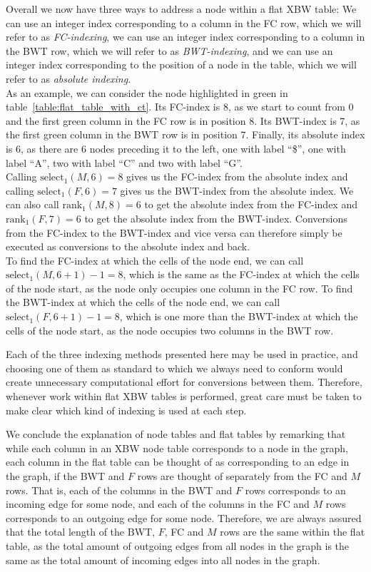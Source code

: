 \documentclass[a4paper,12pt,twoside,BCOR=10mm]{scrbook}
\begin{document}
Overall we now have three ways to address a node within a flat XBW table:
We can use an integer index corresponding to a column in the FC row,
which we will refer to as \textit{FC-indexing}\label{def:fc_indexing},
we can use an integer index corresponding to a column in the BWT row,
which we will refer to as \textit{BWT-indexing}\label{def:bwt_indexing},
and we can use an integer index corresponding to the position of a node in the table,
which we will refer to as \textit{absolute indexing}\label{def:absolute_indexing}. \\
As an example, we can consider the node highlighted in green in table~\ref{table:flat_table_with_ct}.
Its FC-index is 8, as we start to count from 0 and the first green column in the FC row is in position 8.
Its BWT-index is 7, as the first green column in the BWT row is in position 7.
Finally, its absolute index is 6, as there are 6 nodes preceding it to the left, one
with label “\$”, one with label “A”, two with label “C” and two with label “G”. \\
Calling $ \textrm{select}_1 ( M, 6 ) = 8 $ gives us the FC-index from the absolute index and
calling $ \textrm{select}_1 ( F, 6 ) = 7 $ gives us the BWT-index from the absolute index.
We can also call $ \textrm{rank}_1 ( M, 8 ) = 6 $ to get the absolute index from the FC-index
and $ \textrm{rank}_1 ( F, 7 ) = 6 $ to get the absolute index from the BWT-index.
Conversions from the FC-index to the BWT-index and vice versa can therefore simply be executed as conversions
to the absolute index and back. \\
To find the FC-index at which the cells of the node end,
we can call $ \textrm{select}_1 ( M, 6 + 1 ) - 1 = 8 $, which
is the same as the FC-index at which the cells of the node start, as the node
only occupies one column in the FC row.
To find the BWT-index at which the cells of the node end,
we can call $ \textrm{select}_1 ( F, 6 + 1 ) - 1 = 8 $, which
is one more than the BWT-index at which the cells of the node start,
as the node occupies two columns in the BWT row.

Each of the three indexing methods presented here
may be used in practice, and choosing one of them as standard to which
we always need to conform would create unnecessary computational effort for conversions
between them.
Therefore, whenever work within flat XBW tables is performed, great care must be taken
to make clear which kind of indexing is used at each step.

We conclude the explanation of node tables and flat tables by remarking that while each column
in an XBW node table corresponds to a node in the graph,
each column in the flat table can be thought of as corresponding to an edge in the graph,
if the BWT and $ F $ rows are thought of separately from the FC and $ M $ rows.
That is, each of the columns in the BWT and $ F $ rows corresponds to an incoming edge for some node,
and each of the columns in the FC and $ M $ rows corresponds to an outgoing edge for some node.
Therefore, we are always assured that the total length of the BWT, $ F $, FC and $ M $ rows are the same
within the flat table, as the total amount of outgoing edges from all nodes in the graph is
the same as the total amount of incoming edges into all nodes in the graph.
\end{document}
